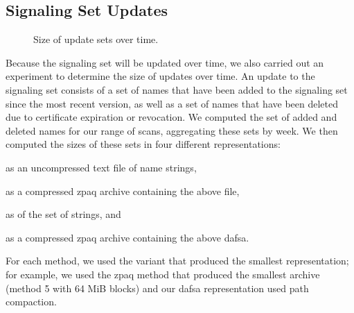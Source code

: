 \subsection{Signaling Set Updates}
\label{sec:evaluation:updates}

\begin{figure}[t]
  \centering
  \caption{Size of update sets over time.}
  \label{fig:updates}
\end{figure}

Because the signaling set will be updated over time, we also carried out an
experiment to determine the size of updates over time. An update to the
signaling set consists of a set of names that have been added to the signaling
set since the most recent version, as well as a set of names that have been
deleted due to certificate expiration or revocation. We computed the set of
added and deleted names for our range of scans, aggregating these sets by week.
We then computed the sizes of these sets in four different representations:
\begin{inparaenum}[(1)]
\item as an uncompressed text file of name strings,
\item as a compressed zpaq archive containing the above file,
\item as  of the set of strings, and
\item as a compressed zpaq archive containing the above \ac{dafsa}.
\end{inparaenum}
For each method, we used the variant that produced the smallest representation;
for example, we used the zpaq method that produced the smallest archive (method
5 with 64 MiB blocks) and our \ac{dafsa} representation used path compaction.

